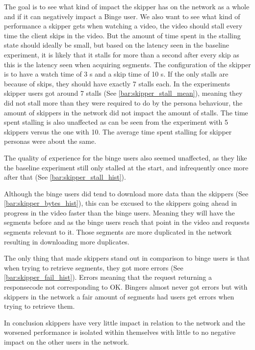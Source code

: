 The goal is to see what kind of impact the skipper has on the network as a whole and if it can negatively impact a Binge user. We also want to see what kind of performance a skipper gets when watching a video, the video should stall every time the client skips in the video. But the amount of time spent in the stalling state should ideally be small, but based on the latency seen in the baseline experiment, it is likely that it stalls for more than a second after every skip as this is the latency seen when acquiring segments. The configuration of the skipper is to have a watch time of 3 \acs{s} and a skip time of 10 \acs{s}. If the only stalls are because of skips, they should have exactly 7 stalls each.
In the experiments skipper users got around 7 stalls (See \autoref{bar:skipper_stall_mean}), meaning they did not stall more than they were required to do by the persona behaviour, the amount of skippers in the network did not impact the amount of stalls. The time spent stalling is also unaffected as can be seen from the experiment with 5 skippers versus the one with 10. The average time spent stalling for skipper personas were about the same.

The quality of experience for the binge users also seemed unaffected, as they like the baseline experiment still only stalled at the start, and infrequently once more after that (See \autoref{bar:skipper_stall_hist}). 

Although the binge users did tend to download more data than the skippers (See \autoref{bar:skipper_bytes_hist}), this can be excused to the skippers going ahead in progress in the video faster than the binge users. Meaning they will have the segments before and as the binge users reach that point in the video and requests segments relevant to it. Those segments are more duplicated in the network resulting in downloading more duplicates.

The only thing that made skippers stand out in comparison to binge users is that when trying to retrieve segments, they got more errors (See \autoref{bar:skipper_fail_hist}). Errors meaning that the request returning a responsecode not corresponding to OK. Bingers almost never got errors but with skippers in the network a fair amount of segments had users get errors when trying to retrieve them. %

In conclusion skippers have very little impact in relation to the network and the worsened performance is isolated within themselves with little to no negative impact on the other users in the network.


